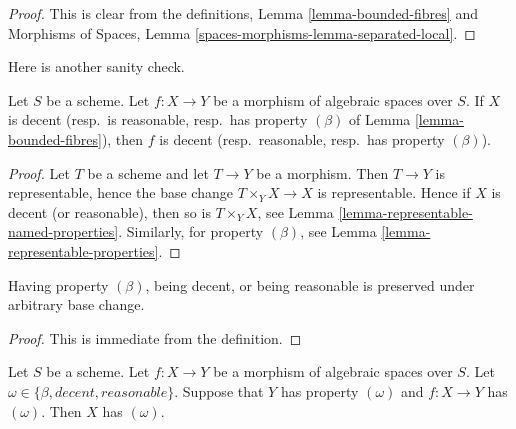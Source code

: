 \begin{proof}
This is clear from the definitions,
Lemma \ref{lemma-bounded-fibres}
and
Morphisms of Spaces,
Lemma \ref{spaces-morphisms-lemma-separated-local}.
\end{proof}

\noindent
Here is another sanity check.

\begin{lemma}
\label{lemma-property-for-morphism-out-of-property}
Let $S$ be a scheme. Let $f : X \to Y$ be a morphism of algebraic
spaces over $S$. If $X$ is decent (resp.\ is reasonable, resp.\ has property
$(\beta)$ of Lemma \ref{lemma-bounded-fibres}), then $f$ is
decent (resp.\ reasonable, resp.\ has property $(\beta)$).
\end{lemma}

\begin{proof}
Let $T$ be a scheme and let $T \to Y$ be a morphism. Then $T \to Y$
is representable, hence the base change $T \times_Y X \to X$ is representable.
Hence if $X$ is decent (or reasonable), then so is $T \times_Y X$, see
Lemma \ref{lemma-representable-named-properties}.
Similarly, for property $(\beta)$, see
Lemma \ref{lemma-representable-properties}.
\end{proof}

\begin{lemma}
\label{lemma-base-change-relative-conditions}
Having property $(\beta)$, being decent, or being reasonable
is preserved under arbitrary base change.
\end{lemma}

\begin{proof}
This is immediate from the definition.
\end{proof}

\begin{lemma}
\label{lemma-property-over-property}
Let $S$ be a scheme.
Let $f : X \to Y$ be a morphism of algebraic spaces over $S$.
Let $\omega \in \{\beta, decent, reasonable\}$.
Suppose that $Y$ has property $(\omega)$ and $f : X \to Y$ has $(\omega)$.
Then $X$ has $(\omega)$.
\end{lemma}

